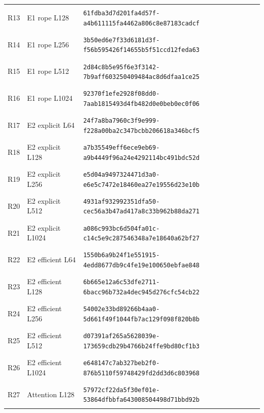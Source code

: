 \begin{longtable}{@{}l>{\raggedright\arraybackslash}p{3.5cm}p{10.8cm}@{}}
\hypertarget{R13}{R13} & E1 rope L128 & {\fontsize{8.8}{11}\selectfont\texttt{61fdba3d7d201fa4d57f-a4b611115fa4462a806c8e87183cadcf}} \\
\hypertarget{R14}{R14} & E1 rope L256 & {\fontsize{8.8}{11}\selectfont\texttt{3b50ed6e7f33d6181d3f-f56b595426f14655b5f51ccd12feda63}} \\
\hypertarget{R15}{R15} & E1 rope L512 & {\fontsize{8.8}{11}\selectfont\texttt{2d84c8b5e95f6e3f3142-7b9aff603250409484ac8d6dfaa1ce25}} \\
\hypertarget{R16}{R16} & E1 rope L1024 & {\fontsize{8.8}{11}\selectfont\texttt{92370f1efe2928f08dd0-7aab1815493d4fb482d0e0beb0ec0f06}} \\
\hypertarget{R17}{R17} & E2 explicit L64 & {\fontsize{8.8}{11}\selectfont\texttt{24f7a8ba7960c3f9e999-f228a00ba2c347bcbb206618a346bcf5}} \\
\hypertarget{R18}{R18} & E2 explicit L128 & {\fontsize{8.8}{11}\selectfont\texttt{a7b35549eff6ece9eb69-a9b4449f96a24e4292114bc491bdc52d}} \\
\hypertarget{R19}{R19} & E2 explicit L256 & {\fontsize{8.8}{11}\selectfont\texttt{e5d04a9497324471d3a0-e6e5c7472e18460ea27e19556d23e10b}} \\
\hypertarget{R20}{R20} & E2 explicit L512 & {\fontsize{8.8}{11}\selectfont\texttt{4931af932992351dfa50-cec56a3b47ad417a8c33b962b88da271}} \\
\hypertarget{R21}{R21} & E2 explicit L1024 & {\fontsize{8.8}{11}\selectfont\texttt{a086c993bc6d504fa01c-c14c5e9c287546348a7e18640a62bf27}} \\
\hypertarget{R22}{R22} & E2 efficient L64 & {\fontsize{8.8}{11}\selectfont\texttt{1550b6a9b24f1e551915-4edd8677db9c4fe19e100650ebfae848}} \\
\hypertarget{R23}{R23} & E2 efficient L128 & {\fontsize{8.8}{11}\selectfont\texttt{6b665e12a6c53dfe2711-6bacc96b732a4dec945d276cfc54cb22}} \\
\hypertarget{R24}{R24} & E2 efficient L256 & {\fontsize{8.8}{11}\selectfont\texttt{54002e33bd89266b4aa0-5d661f49f1044fb7ac129f098f820b8b}} \\
\hypertarget{R25}{R25} & E2 efficient L512 & {\fontsize{8.8}{11}\selectfont\texttt{d07391af265a5628039e-173659cdb29b4766b24ffe9bd80cf1b3}} \\
\hypertarget{R26}{R26} & E2 efficient L1024 & {\fontsize{8.8}{11}\selectfont\texttt{e648147c7ab327beb2f0-876b5110f59748429fd2dd3d6c803968}} \\
\hypertarget{R27}{R27} & Attention L128 & {\fontsize{8.8}{11}\selectfont\texttt{57972cf22da5f30ef01e-53864dfbbfa643008504498d71bbd92b}} \\

\end{longtable}
